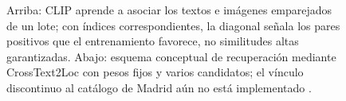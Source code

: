 \begin{figure}[htbp]
\caption{Arriba: CLIP aprende a asociar los textos e imágenes emparejados de un lote; con índices correspondientes, la diagonal señala los pares positivos que el entrenamiento favorece, no similitudes altas garantizadas. Abajo: esquema conceptual de recuperación mediante CrossText2Loc con pesos fijos y varios candidatos; el vínculo discontinuo al catálogo de Madrid aún no está implementado \cite{radford2021clip,ye2025crosstext}.}
\label{fig:clip-recuperacion}
\end{figure}
